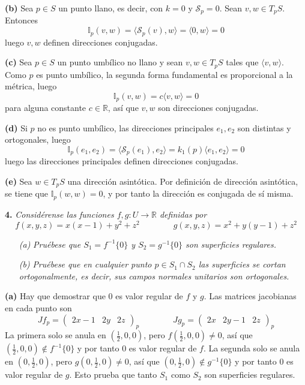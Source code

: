 \documentclass[12pt]{report}
\newcommand{\R}{\mathbb R}
\begin{document}
\vspace{2mm}
\textbf{(b) } Sea $p \in S$ un punto llano, es decir, con $k = 0$ y $\mathcal{S}_p = 0$. Sean $v,w \in T_pS$. Entonces
\[\mathbb{I}_p(v,w) = \langle \mathcal{S}_p(v),w \rangle = \langle 0, w\rangle =0\]
luego $v,w$ definen direcciones conjugadas.

\vspace{2mm}
\textbf{(c) }
Sea $p \in S$ un punto umbílico no llano y sean $v,w \in T_pS$ tales que $\langle v,w \rangle$. Como $p$ es punto umbílico, la segunda forma fundamental es proporcional a la métrica, luego
\[\mathbb{I}_p(v,w) = c \langle v,w \rangle = 0\]
para alguna constante $c \in \R$, así que $v,w$ son direcciones conjugadas.

\vspace{2mm}
\textbf{(d) } Si $p$ no es punto umbílico, las direcciones principales $e_1,e_2$ son distintas y ortogonales, luego
\[\mathbb{I}_p(e_1,e_2) = \langle \mathcal{S}_p(e_1),e_2 \rangle = k_1(p)\langle e_1,e_2 \rangle = 0\]
luego las direcciones principales definen direcciones conjugadas.

\vspace{2mm}
\textbf{(e) } Sea $w \in T_pS$ una dirección asintótica. Por definición de dirección asintótica, se tiene que $\mathbb{I}_p(w,w) = 0$, y por tanto la dirección es conjugada de sí misma.

\vspace{4mm}
\textbf{4. } \textit{Considérense las funciones $f,g \colon U \to \R$ definidas por
\[f(x,y,z) = x(x-1)+y^2+z^2 \qquad \qquad g(x,y,z) = x^2+y(y-1)+z^2
\]}
\begin{itemize}
    \item[\textit{(a)}] \textit{Pruébese que $S_1 = f^{-1}\{0\}$ y $S_2 = g^{-1}\{0\}$ son superficies regulares.}
    \item[\textit{(b)}] \textit{Pruébese que en cualquier punto $p \in S_1 \cap S_2$ las superficies se cortan ortogonalmente, es decir, sus campos normales unitarios son ortogonales.}
\end{itemize}

\textbf{(a) } Hay que demostrar que $0$ es valor regular de $f$ y $g$. Las matrices jacobianas en cada punto son
\[Jf_p =\begin{pmatrix}
    2x-1 & 2y & 2z
\end{pmatrix}_p \qquad \qquad Jg_p =\begin{pmatrix}
    2x & 2y-1 & 2z
\end{pmatrix}_p \]
La primera solo se anula en $(\frac{1}{2},0,0)$, pero $f(\frac{1}{2},0,0) \neq 0$, así que $(\frac{1}{2},0,0) \notin f^{-1}\{0\}$ y por tanto $0$ es valor regular de $f$. La segunda solo se anula en $(0,\frac{1}{2},0)$, pero $g(0,\frac{1}{2},0) \neq 0$, así que $(0,\frac{1}{2},0) \notin g^{-1}\{0\}$ y por tanto $0$ es valor regular de $g$. Esto prueba que tanto $S_1$ como $S_2$ son superficies regulares.
\end{document}
